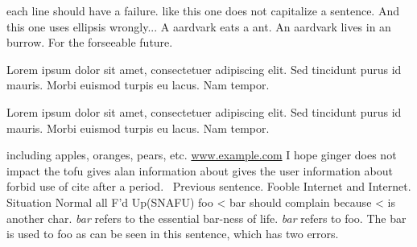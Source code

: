 each line should have a failure.  like this one does not capitalize a sentence.
And this one uses ellipsis wrongly...
A aardvark eats a ant.
An aardvark lives in an burrow.
For the forseeable future.
\caption{Lorem ipsum dolor sit amet, consectetuer adipiscing elit. Sed tincidunt purus id mauris. Morbi euismod turpis eu lacus. Nam tempor.}
\caption{\label{thelabel}Lorem ipsum dolor sit amet, consectetuer adipiscing elit. Sed tincidunt purus id mauris. Morbi euismod turpis eu lacus. Nam tempor.}
including apples, oranges, pears, etc.
\url{www.example.com}
I hope ginger does not impact the tofu
gives alan information about
gives the user information about
forbid use of cite after a period.~\cite{foo}
Previous sentence.  Fooble Internet and Internet.
Situation Normal all F'd Up(SNAFU)
foo < bar should complain because < is another char.
\emph{bar} refers to the essential bar-ness of life.
\emph{bar} refers to foo.
The bar is used to foo as can be seen in this sentence, which has two errors.
